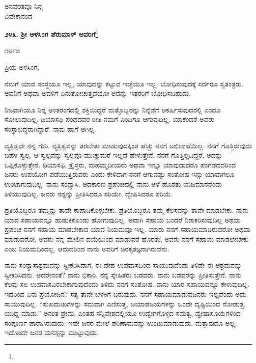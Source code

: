 {\flushright
ಅನವರತವೂ ನಿನ್ನ\\ವಿವೇಕಾನಂದ\par}

\begin{center}
\textbf{೨೪೩. ಶ‍್ರೀ ಅಳಸಿಂಗ ಪೆರುಮಾಳ್ ಅವರಿಗೆ}\footnote{}
\end{center}

\begin{flushright}
೧೮೯೫
\end{flushright}

\noindent
ಪ್ರಿಯ ಅಳಸಿಂಗ,

ನಮಗೆ ಯಾವ ಸಂಸ್ಥೆಯೂ ಇಲ್ಲ, ಯಾವುದನ್ನು ಕಟ್ಟುವ ಇಚ್ಛೆಯೂ ಇಲ್ಲ. ಬೋಧಿಸುವುದಕ್ಕೆ ಸರ್ವರೂ ಸ್ವತಂತ್ರರು. ಅವನಿಗೆ ಅಥವಾ ಅವಳಿಗೆ ಏನುತೋಚುತ್ತದೆಯೋ ಅದನ್ನು ಇತರರಿಗೆ ಬೋಧಿಸಬಹುದು.

ನಿಜವಾಗಿಯೂ ನಿನ್ನ ಅಂತರಂಗದಲ್ಲಿ ಶಕ್ತಿಯಿದ್ದರೆ ಮತ್ತೊಬ್ಬರನ್ನು ನಿನ್ನೆಡೆಗೆ ಆಕರ್ಷಿಸುವುದರಲ್ಲಿ ಎಂದೂ ಸೋಲುವುದಿಲ್ಲ. ಥಿಯಾಸಫಿ ಪಂಥದವರ ರೀತಿ ನಮಗೆ ಎಂದಿಗೂ ಆಗುವುದಿಲ್ಲ. ಯಾಕೆಂದರೆ ಅವರು ಸಂಸ್ಥಾಬದ್ಧರಾಗಿದ್ದಾರೆ. ನಾವು ಹಾಗೆ ಆಗಿಲ್ಲ.

ವ್ಯಕ್ತಿತ್ವವೇ ನನ್ನ ಗುರಿ. ವ್ಯಕ್ತಿತ್ವವನ್ನು ತರಬೇತು ಮಾಡುವುದಕ್ಕಿಂತ ಹೆಚ್ಚು ನನಗೆ ಅಭಿಲಾಷೆಯಿಲ್ಲ. ನನಗೆ ಗೊತ್ತಿರುವುದು ಬಹಳ ಸ್ವಲ್ಪ. ಆ ಸ್ವಲ್ಪವನ್ನು ಸ್ವಲ್ಪವೂ ಮುಚ್ಚುಮರೆ ಇಲ್ಲದೆ ಹೇಳುತ್ತೇನೆ. ನನಗೆ ಗೊತ್ತಿಲ್ಲದಿದ್ದರೆ, ಅದನ್ನು ಒಪ್ಪಿಕೊಳ್ಳುತ್ತೇನೆ. ಥಿಯಾಸಫಿ, ಕ್ರೈಸ್ತರು, ಮಹಮ್ಮದೀಯರು ಅಥವಾ ಇನ್ನೂ ಯಾವುದಾದರೂ ಪಂಗಡದವರಿಂದ ಜನರು ಉಪಯೋಗ ಪಡೆಯುತ್ತಿರುವರು ಎಂದು ಕೇಳಿದಾಗ ನನಗೆ ಆಗುವಷ್ಟು ಸಂತೋಷ ಇನ್ನು ಯಾವಾಗಲೂ ಉಂಟಾಗುವುದಿಲ್ಲ. ನಾನು ಸಂನ್ಯಾಸಿ. ಆದಕಾರಣ ಪ್ರಪಂಚದಲ್ಲಿ ನಾನು ಆಳೆ ಹೊರತು ಯಜಮಾನನೆಂದು ತಿಳಿಯುವುದಿಲ್ಲ. ಜನರು ನನ್ನನ್ನು ಪ್ರೀತಿಸಿದರೂ ಸರಿಯೇ, ದ್ವೇಷಿಸಿದರೂ ಸರಿಯೆ.

\vspace{0.2cm}

ಪ್ರತಿಯೊಬ್ಬರೂ ತಮ್ಮನ್ನು ತಾವೇ ಕಾಪಾಡಿಕೊಳ್ಳಬೇಕು. ಪ್ರತಿಯೊಬ್ಬರೂ ತಮ್ಮ ಕೆಲಸವನ್ನು ತಾವೇ ಮಾಡಬೇಕು. ನಾನು ಯಾವ ಸಹಾಯವನ್ನೂ ಹುಡುಕಿಕೊಂಡು ಹೋಗುವುದಿಲ್ಲ. ಅದಾಗಿ ಸಹಾಯ ಬಂದರೆ ನಿರಾಕರಿಸುವುದಿಲ್ಲ ಅಥವಾ ಪ್ರಪಂಚ ನನಗೆ ಸಹಾಯ ಮಾಡಬೇಕಾದ ಯಾವ ನಿಯಮವೂ ಇಲ್ಲ. ಯಾರು ನನಗೆ ಸಹಾಯಮಾಡಿರುವರೋ ಅಥವಾ ಮಾಡುವರೋ, ಅವರು ನನ್ನ ಮೇಲಿನ ದಯೆಯಿಂದ ಮಾಡುವರೆ ಹೊರತು, ಅವರು ನನಗೆ ಸಹಾಯ ಮಾಡಲೇಬೇಕು ಎಂಬ ನಿಯಮದಿಂದಲ್ಲ. ಆದುದರಿಂದ ನಾನು ಅವರಿಗೆ ಚಿರಕೃತಜ್ಞನಾಗಿರುವೆನು.

\vspace{0.2cm}

ನಾನು ಸಂನ್ಯಾಸಾಶ್ರಮವನ್ನು ಸ್ವೀಕರಿಸಿದಾಗ, ಈ ದೇಹ ಉಪವಾಸದಿಂದ ಸಾಯುವುದೆಂದು ತಿಳಿದೇ ಈ ಆಶ್ರಮವನ್ನು ಸ್ವೀಕರಿಸಿದನು. ಆದರೇನಂತೆ? ನಾನು ಭಿಕಾರಿ. ನನ್ನ ಸ್ನೇಹಿತರು ಬಡವರು. ನಾನು ಬಡವರನ್ನು ಪ್ರೀತಿಸುತ್ತೇನೆ. ನಾನು ಕೆಲವು ಸಲ ಉಪವಾಸವಿರಬೇಕಾಗುವುದೆಂದು ತಿಳಿದು ನನಗೆ ಸಂತೋಷ. ನಾನು ಯಾರ ಸಹಾಯವನ್ನೂ ಕೇಳುವುದಿಲ್ಲ. ಇದರಿಂದ ಏನು ಪ್ರಯೋಜನ? ಸತ್ಯ ತಾನೇ ಬೆಳಕಿಗೆ ಬರುವುದು. ನನಗೆ ಸಹಾಯಮಾಡುವಜನರು ಇಲ್ಲವೆಂದು ಅದು ಸಾಯುವುದಿಲ್ಲ. ``ಸುಖದುಃಖಗಳನ್ನು ಸಮವಾಗಿ ಎಣಿಸುತ್ತ, ಜಯಾಪಜಯಗಳನ್ನು ಒಂದೇ ದೃಷ್ಟಿಯಿಂದ ನೋಡುತ್ತ, ಯುದ್ದ ಮಾಡು.” ಅನಂತ ಪ್ರೇಮ, ಎಂತಹ ಸನ್ನಿವೇಶದಲ್ಲಿಯೂ ಉದ್ವೇಗಗೊಳ್ಳದ ಸಮತ್ವ, ದ್ವೇಷಾಸೂಯೆಗಳಿಂದ ಸಂಪೂರ್ಣ ಪಾರಾಗಿರುವುದು, ಇವೇ ಜನರ ಮೇಲೆ ಪರಿಣಾಮವನ್ನು ಉಂಟುಮಾಡುವುದು. ಮತ್ತಾವುದೂ ಅಲ್ಲ. ಇದೊಂದೇ ಜನರ ಮನಸ್ಸನ್ನು ಮುಟ್ಟುವುದು.

